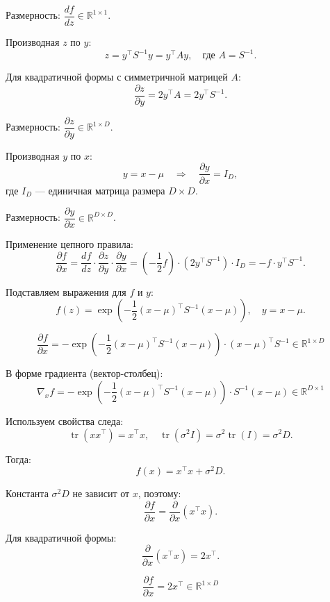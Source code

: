 \documentclass[pract]{SCWorks}
\begin{document}
    Размерность: $\dfrac{df}{dz} \in \mathbb{R}^{1 \times 1}$.

    Производная $z$ по $y$:
    \[
    z = y^\top S^{-1}y = y^\top A y, \quad \text{где } A = S^{-1}.
    \]

    Для квадратичной формы с симметричной матрицей $A$:
    \[
    \frac{\partial z}{\partial y} = 2y^\top A = 2y^\top S^{-1}.
    \]

    Размерность: $\dfrac{\partial z}{\partial y} \in \mathbb{R}^{1 \times D}$.

    Производная $y$ по $x$:
    \[
    y = x - \mu \quad \Rightarrow \quad \frac{\partial y}{\partial x} = I_D,
    \]
    где $I_D$ — единичная матрица размера $D \times D$.

    Размерность: $\dfrac{\partial y}{\partial x} \in \mathbb{R}^{D \times D}$.

    Применение цепного правила:
    \[
    \frac{\partial f}{\partial x} = \frac{df}{dz} \cdot \frac{\partial z}{\partial y} \cdot \frac{\partial y}{\partial x}
    = \left(-\frac{1}{2} f\right) \cdot \left(2y^\top S^{-1}\right) \cdot I_D
    = -f \cdot y^\top S^{-1}.
    \]

    Подставляем выражения для $f$ и $y$:
    \[
    f(z) = \exp\left(-\frac{1}{2} (x - \mu)^\top S^{-1} (x - \mu)\right), \quad y = x - \mu.
    \]

    \[
    \boxed{\frac{\partial f}{\partial x} = -\exp\left(-\frac{1}{2} (x - \mu)^\top S^{-1} (x - \mu)\right) \cdot (x - \mu)^\top S^{-1} \in \mathbb{R}^{1 \times D}}
    \]

    В форме градиента (вектор-столбец):
    \[
    \boxed{\nabla_x f = -\exp\left(-\frac{1}{2} (x - \mu)^\top S^{-1} (x - \mu)\right) \cdot S^{-1} (x - \mu) \in \mathbb{R}^{D \times 1}}
    \]

    Используем свойства следа:
    \[
    \operatorname{tr}(xx^\top) = x^\top x, \quad \operatorname{tr}(\sigma^2 I) = \sigma^2 \operatorname{tr}(I) = \sigma^2 D.
    \]

    Тогда:
    \[
    f(x) = x^\top x + \sigma^2 D.
    \]

    Константа $\sigma^2 D$ не зависит от $x$, поэтому:
    \[
    \frac{\partial f}{\partial x} = \frac{\partial}{\partial x} (x^\top x).
    \]

    Для квадратичной формы:
    \[
    \frac{\partial}{\partial x} (x^\top x) = 2x^\top.
    \]

    \[
    \boxed{\frac{\partial f}{\partial x} = 2x^\top \in \mathbb{R}^{1 \times D}}
    \]
\end{document}
